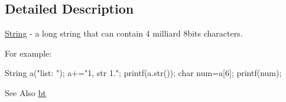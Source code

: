 \subsection{Detailed Description}
\hyperlink{classbt_1_1_string}{String} -\/ a long string that can contain 4 milliard 8bits characters. 

For example\-: \begin{DoxyVerb}  String a("list: ");
  a+="1, str 1.";
  printf(a.str());
  char num=a[6];
  printf(num);
\end{DoxyVerb}


\begin{DoxySeeAlso}{See Also}
\hyperlink{namespacebt}{bt} 
\end{DoxySeeAlso}
